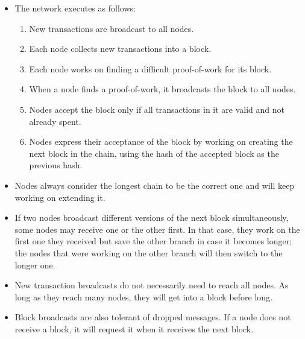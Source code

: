 \documentclass{article}
\begin{document}
\begin{itemize}
  \item The network executes as follows:
    \begin{enumerate}
      \item New transactions are broadcast to all nodes.
      \item Each node collects new transactions into a block.
      \item Each node works on finding a difficult proof-of-work for its block.
      \item When a node finds a proof-of-work, it broadcasts the block to all
        nodes.
      \item Nodes accept the block only if all transactions in it are valid and
        not already spent.
      \item Nodes express their acceptance of the block by working on creating
        the next block in the chain, using the hash of the accepted block as the
        previous hash.
    \end{enumerate}
  \item Nodes always consider the longest chain to be the correct one and will
    keep working on extending it.
  \item If two nodes broadcast different versions of the next block
    simultaneously, some nodes may receive one or the other first. In that case,
    they work on the first one they received but save the other branch in case
    it becomes longer; the nodes that were working on the other branch will then
    switch to the longer one.
  \item New transaction broadcasts do not necessarily need to reach all nodes.
    As long as they reach many nodes, they will get into a block before long.
  \item Block broadcasts are also tolerant of dropped messages. If a node does
    not receive a block, it will request it when it receives the next block.
\end{itemize}
\end{document}
